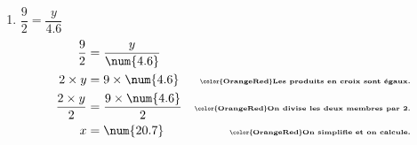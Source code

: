 \begin{corrige}
\begin{enumerate}
        \item $\dfrac{9}{2}=\dfrac{y}{\num{4.6}}$        
        \begin{align*}
            \dfrac{9}{2}        &=\dfrac{y}{\num{4.6}}           &\\
            2\times y           &= 9\times\num{4.6}             &\text{\bfseries\tiny\color{OrangeRed}Les produits en croix sont égaux.}\\
            \dfrac{2\times y}{2}&= \dfrac{9\times\num{4.6}}{2}  &\text{\bfseries\tiny\color{OrangeRed}On divise les deux membres par 2.}\\
            x                   &=\num{20.7}              &\text{\bfseries\tiny\color{OrangeRed}On simplifie et on calcule.}
        \end{align*}
    \end{enumerate}
\end{corrige}

